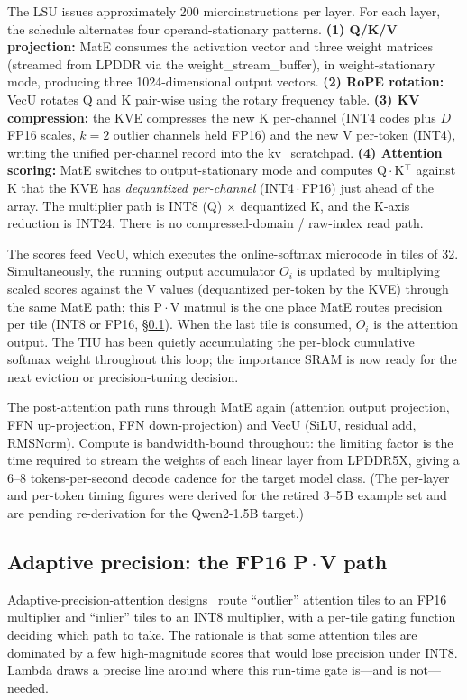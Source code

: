 \documentclass[conference]{IEEEtran}
\begin{document}
The LSU issues approximately 200 microinstructions per layer. For each layer, the schedule alternates four operand-stationary patterns. \textbf{(1) Q/K/V projection:} MatE consumes the activation vector and three weight matrices (streamed from LPDDR via the weight\_stream\_buffer), in weight-stationary mode, producing three 1024-dimensional output vectors. \textbf{(2) RoPE rotation:} VecU rotates Q and K pair-wise using the rotary frequency table. \textbf{(3) KV compression:} the KVE compresses the new K per-channel (INT4 codes plus $D$ FP16 scales, $k{=}2$ outlier channels held FP16) and the new V per-token (INT4), writing the unified per-channel record into the kv\_scratchpad. \textbf{(4) Attention scoring:} MatE switches to output-stationary mode and computes Q\,$\cdot$\,K$^\top$ against K that the KVE has \textit{dequantized per-channel} (INT4\,$\cdot$\,FP16) just ahead of the array. The multiplier path is INT8 (Q) $\times$ dequantized K, and the K-axis reduction is INT24. There is no compressed-domain / raw-index read path.

The scores feed VecU, which executes the online-softmax microcode in tiles of 32. Simultaneously, the running output accumulator $O_i$ is updated by multiplying scaled scores against the V values (dequantized per-token by the KVE) through the same MatE path; this P\,$\cdot$\,V matmul is the one place MatE routes precision per tile (INT8 or FP16, \S\ref{sec:pv-precision}). When the last tile is consumed, $O_i$ is the attention output. The TIU has been quietly accumulating the per-block cumulative softmax weight throughout this loop; the importance SRAM is now ready for the next eviction or precision-tuning decision.

The post-attention path runs through MatE again (attention output projection, FFN up-projection, FFN down-projection) and VecU (SiLU, residual add, RMSNorm). Compute is bandwidth-bound throughout: the limiting factor is the time required to stream the weights of each linear layer from LPDDR5X, giving a 6--8 tokens-per-second decode cadence for the target model class. (The per-layer and per-token timing figures were derived for the retired 3--5\,B example set and are pending re-derivation for the Qwen2-1.5B target.)

\subsection{Adaptive precision: the FP16 P\,$\cdot$\,V path}
\label{sec:pv-precision}

Adaptive-precision-attention designs~\cite{adaptive_kv,chaithu_acu} route ``outlier'' attention tiles to an FP16 multiplier and ``inlier'' tiles to an INT8 multiplier, with a per-tile gating function deciding which path to take. The rationale is that some attention tiles are dominated by a few high-magnitude scores that would lose precision under INT8. Lambda draws a precise line around where this run-time gate is---and is not---needed.
\end{document}
